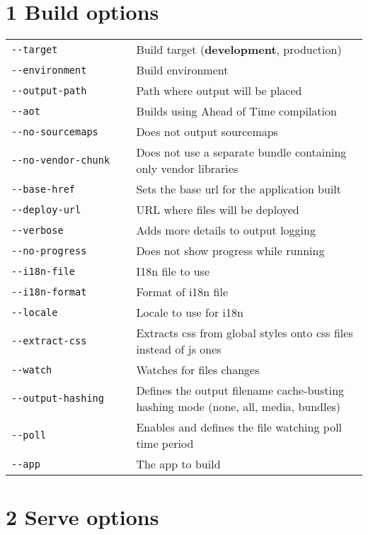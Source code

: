 \documentclass[8pt]{extarticle} %
\begin{document}
\begin{multicols}{3}
\section*{1 Build options}

  \begin{tabular}{L{0.35\linewidth} L{0.65\linewidth}}
    \tt -{}-target  & \small Build target ({\bf development}, production)\\
    \tt -{}-environment  & \small Build environment \\
    \tt -{}-output-path  & \small Path where output will be placed \\
    \tt -{}-aot & \small Builds using Ahead of Time compilation \\
    \tt -{}-no-sourcemaps & \small Does not output sourcemaps \\
    \tt -{}-no-vendor-chunk & \small Does not use a separate bundle containing only vendor libraries \\
    \tt -{}-base-href  & \small Sets the base url for the application built \\
    \tt -{}-deploy-url  & \small URL where files will be deployed \\
    \tt -{}-verbose & \small Adds more details to output logging \\
    \tt -{}-no-progress & \small Does not show progress while running \\
    \tt -{}-i18n-file  & \small I18n file to use \\
    \tt -{}-i18n-format  & \small Format of i18n file\\
    \tt -{}-locale  & \small Locale to use for i18n \\
    \tt -{}-extract-css & \small Extracts css from global styles onto css files instead of js ones\\
    \tt -{}-watch & \small Watches for files changes \\
    \tt -{}-output-hashing  & \small Defines the output filename cache-busting hashing mode (none, all, media, bundles)\\
    \tt -{}-poll  & \small Enables and defines the file watching poll time period \\
    \tt -{}-app  & \small The app to build
  \end{tabular}

\section*{2 Serve options}


\end{multicols}
\end{document}
